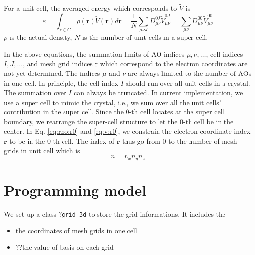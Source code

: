 \documentclass{article}
\begin{document}
For a unit cell, the averaged energy which corresponds to $\tilde{V}$ is
\begin{equation}
  \varepsilon = \int_{\mathbf{r}\in C} \rho(\mathbf{r})\tilde{V}(\mathbf{r}) d\mathbf{r}
  = \frac{1}{N}\sum_{\mu\nu J} D_{\mu\nu}^{0J} \tilde{V}_{\mu\nu}^{0J}
  = \sum_{\mu\nu} D_{\mu\nu}^{00} \tilde{V}_{\mu\nu}^{00}
  \label{}
\end{equation}
$\rho$ is the actual density, $N$ is the number of unit cells in a super cell.

In the above equations, the summation limits of AO indices $\mu,\nu,\dots$,
cell indices $I,J,\dots$, and mesh grid indices $\mathbf{r}$ which correspond
to the electron coordinates are not yet determined.
The indices $\mu$ and $\nu$ are always limited to the number of AOs in one cell.
In principle, the cell index $I$ should run over all unit cells in a
crystal.  The summation over $I$ can always be truncated.
In current implementation, we use a super cell to mimic the crystal,
i.e., we sum over all the unit cells' contribution in the super cell.
Since the 0-th cell locates at the super cell boundary, we rearrange the
super-cell structure to let the 0-th cell be in the center.
In Eq. \eqref{eq:rho:r0} and \eqref{eq:v:r0}, we constrain the electron
coordinate index $\mathbf{r}$ to be in the $0$-th cell.
The index of $\mathbf{r}$ thus go from 0 to the number of mesh grids in unit
cell which is
\begin{equation}
  n = n_x n_y n_z
  \label{}
\end{equation}


\section{Programming model}
We set up a class ?\verb$grid_3d$ to store the
grid informations. It includes the
\begin{itemize}
  \item the coordinates of mesh grids in one cell
  \item ??the value of basis on each grid
\end{itemize}
\end{document}
